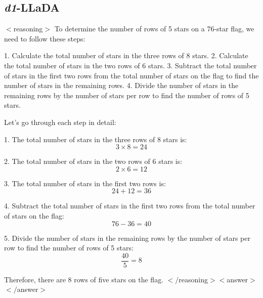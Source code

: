 \subsection{\emph{d1}-LLaDA}
\begin{tcolorbox}[breakable, float, title=\textbf{Model:} \emph{d1}-LLaDA \\ \textbf{Generation Sequence Length:} 512 \\ \textbf{Question:} A 76-star flag has three rows of 8 stars\, two rows of 6 stars and the rest are 5-star rows. How many rows of 5 stars are there altogether on the flag?]
$<$reasoning$>$
To determine the number of rows of 5 stars on a 76-star flag, we need to follow these steps:

1. Calculate the total number of stars in the three rows of 8 stars.
2. Calculate the total number of stars in the two rows of 6 stars.
3. Subtract the total number of stars in the first two rows from the total number of stars on the flag to find the number of stars in the remaining rows.
4. Divide the number of stars in the remaining rows by the number of stars per row to find the number of rows of 5 stars.

Let's go through each step in detail:

1. The total number of stars in the three rows of 8 stars is:
   \[
   3 \times 8 = 24
   \]

2. The total number of stars in the two rows of 6 stars is:
   \[
   2 \times 6 = 12
   \]

3. The total number of stars in the first two rows is:
   \[
   24 + 12 = 36
   \]

4. Subtract the total number of stars in the first two rows from the total number of stars on the flag:
   \[
   76 - 36 = 40
   \]

5. Divide the number of stars in the remaining rows by the number of stars per row to find the number of rows of 5 stars:
   \[
   \frac{40}{5} = 8
   \]

Therefore, there are 8 rows of five stars on the flag.
$</$reasoning$>
<$answer$>$
\textcolor{green!70!black}{}
$</$answer$>$

\end{tcolorbox}
